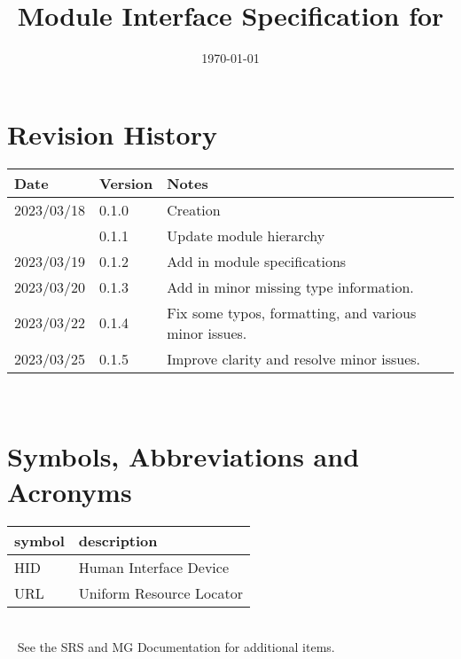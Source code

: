 \documentclass[12pt, titlepage]{article}
\begin{document}
\title{Module Interface Specification for \progname{}}

\author{\authname}

\date{\today}

\maketitle


\section{Revision History}

\begin{tabularx}{\textwidth}{p{3cm}p{2cm}X}
\toprule {\bf Date} & {\bf Version} & {\bf Notes}\\
\midrule
2023/03/18 & 0.1.0 & Creation\\
           & 0.1.1 & Update module hierarchy\\
2023/03/19 & 0.1.2 & Add in module specifications\\
2023/03/20 & 0.1.3 & Add in minor missing type information.\\
2023/03/22 & 0.1.4 & Fix some typos, formatting, and various minor issues.\\
2023/03/25 & 0.1.5 & Improve clarity and resolve minor issues.\\
\bottomrule
\end{tabularx}

~\newpage

\section{Symbols, Abbreviations and Acronyms}

\renewcommand{\arraystretch}{1.2}
\begin{tabular}{l l} 
  \toprule		
  \textbf{symbol} & \textbf{description}\\
  \midrule 
  HID & Human Interface Device\\
  URL & Uniform Resource Locator\\
  \bottomrule
\end{tabular}\\

~\newline
\noindent See the SRS \cite{SRS} and MG \cite{MG} Documentation for additional items.

\newpage
\end{document}
